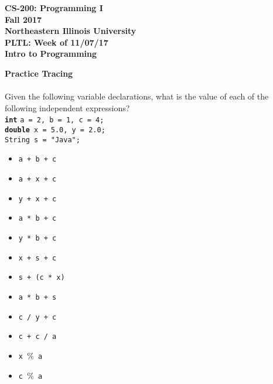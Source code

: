 \documentclass[12pt]{article}
\begin{document}
\begin{center}
	\textbf{CS-200: Programming I}\\
	\textbf{Fall 2017}\\
	\textbf{Northeastern Illinois University}\\
	\textbf{PLTL: Week of 11/07/17}\\
	\textbf{Intro to Programming}
\end{center}

\noindent\textbf{Practice Tracing}\\ \\
Given the following variable declarations, what is the value of each of the following independent expressions?\\
\hspace*{0.5cm}\textbf{\texttt{int}} \texttt{a = 2, b = 1, c = 4;}\\
\hspace*{0.5cm}\textbf{\texttt{double}}\texttt{ x = 5.0, y = 2.0;}\\
\hspace*{0.5cm}\texttt{String s = "Java";}
\begin{itemize}
	\item \texttt{a + b + c}
	\item \texttt{a + x + c}
	\item \texttt{y + x + c}
	\item \texttt{a * b + c}
	\item \texttt{y * b + c}
	\item \texttt{x + s + c}
	\item \texttt{s + (c * x)}
	\item \texttt{a * b + s}
	\item \texttt{c / y + c}
	\item \texttt{c + c / a}
	\item \texttt{x $\%$ a}
	\item \texttt{c $\%$ a}
\end{itemize}
\end{document}
